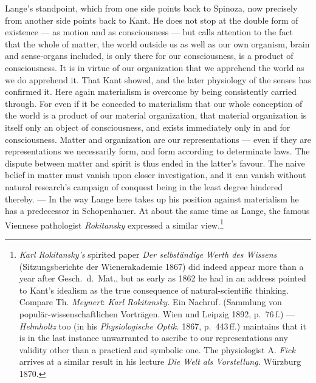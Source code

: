\documentclass[12pt,a4paper]{book}
\begin{document}
Lange's standpoint, which from one side points back to Spinoza, now precisely
from another side points back to Kant. He does not stop at the double form of
existence --- as motion and as consciousness --- but calls attention to the fact
that the whole of matter, the world outside us as well as our own organism, brain
and sense-organs included, is only there for our consciousness, is a product of
consciousness. It is in virtue of our organization that we apprehend the world as
we do apprehend it. That Kant showed, and the later physiology of the senses has
confirmed it. Here again materialism is overcome by being consistently carried
through. For even if it be conceded to materialism that our whole conception of
the world is a product of our material organization, that material organization
is itself only an object of consciousness, and exists immediately only in and for
consciousness. Matter and organization are our representations --- even if they
are representations we necessarily form, and form according to determinate laws.
The dispute between matter and spirit is thus ended in the latter's favour. The
naive belief in matter must vanish upon closer investigation, and it can vanish
without natural research's campaign of conquest being in the least degree
hindered thereby. --- In the way Lange here takes up his position against
materialism he has a predecessor in Schopenhauer. At about the same time as
Lange, the famous Viennese pathologist \emph{Rokitansky} expressed a similar
view.\footnote{\emph{Karl Rokitansky's} spirited paper \textit{Der selbständige Werth
des Wissens} (Sitzungsberichte der Wienerakademie 1867) did indeed appear more
than a year after Gesch.\ d.\ Mat., but as early as 1862 he had in an address
pointed to Kant's idealism as the true consequence of natural-scientific
thinking. Compare Th. \emph{Meynert}: \textit{Karl Rokitansky.} Ein Nachruf. (Sammlung
von populär-wissenschaftlichen Vorträgen. Wien und Leipzig 1892, p.~76\,f.) ---
\emph{Helmholtz} too (in his \textit{Physiologische Optik.} 1867, p.~443\,ff.) maintains
that it is in the last instance unwarranted to ascribe to our representations any
validity other than a practical and symbolic one. The physiologist A. \emph{Fick}
arrives at a similar result in his lecture \textit{Die Welt als Vorstellung.}
Würzburg 1870.}
\end{document}
